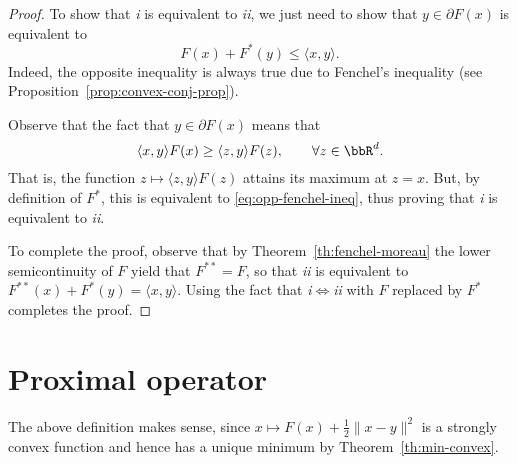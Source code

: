  \begin{proof}
     To show that \emph{i} is equivalent to \emph{ii}, we just need to show that $y\in \partial F(x)$ is equivalent to
     \begin{equation}
         \label{eq:opp-fenchel-ineq}
         F(x)+F^*(y) \le \langle  x,y\rangle.
     \end{equation}
     Indeed, the opposite inequality is always true due to Fenchel's inequality (see Proposition~\ref{prop:convex-conj-prop}).
 
     Observe that the fact that $y\in\partial F(x)$ means that
     \begin{equation}
         \langle x,y\rangle F(x)
         \ge \langle z,y\rangle F(z), \qquad \forall z\in \bbR^d.
     \end{equation}
     That is, the function $z\mapsto \langle z,y\rangle F(z)$ attains its maximum at $z=x$. But, by definition of $F^*$, this is equivalent to \eqref{eq:opp-fenchel-ineq}, thus proving that \emph{i} is equivalent to \emph{ii}.
 
     To complete the proof, observe that by Theorem~\ref{th:fenchel-moreau} the lower semicontinuity of $F$ yield that $F^{**}=F$, so that \emph{ii} is equivalent to $F^{**}(x)+F^*(y)=\langle x,y\rangle$. Using the fact that \emph{i}$\iff$\emph{ii} with $F$ replaced by $F^*$ completes the proof.
 \end{proof}
 
 \section{Proximal operator}
 \label{sec:proximal}
 
 
 The above definition makes sense, since $x\mapsto F(x) + \frac12 \|x-y\|^2$ is a strongly convex function and hence has a unique minimum by Theorem~\ref{th:min-convex}.
 
 
